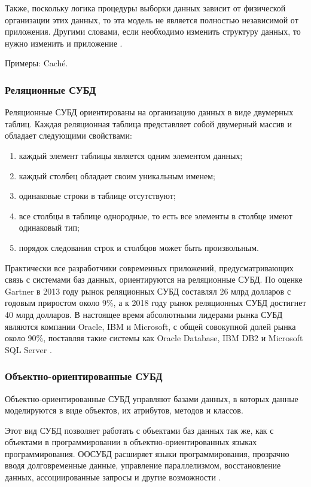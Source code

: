 \documentclass[a4paper,14pt]{extreport}
\begin{document}
Также, поскольку логика процедуры выборки данных зависит от физической организации этих данных, то эта модель не является полностью независимой от приложения. Другими словами, если необходимо изменить структуру данных, то нужно изменить и приложение \cite{scienceforum}.

Примеры: Caché.

\subsubsection*{Реляционные СУБД}
Реляционные СУБД ориентированы на организацию данных в виде двумерных таблиц. Каждая реляционная таблица представляет собой двумерный массив и обладает следующими свойствами:

\begin{enumerate}
	\setlength\itemsep{0.01em}
	\item каждый элемент таблицы является одним элементом данных;
	\item каждый столбец обладает своим уникальным именем;
	\item одинаковые строки в таблице отсутствуют;
	\item все столбцы в таблице однородные, то есть все элементы в столбце имеют одинаковый тип;
	\item порядок следования строк и столбцов может быть произвольным.
\end{enumerate}

Практически все разработчики современных приложений, предусматривающих связь с системами баз данных, ориентируются на реляционные СУБД. По оценке Gartner в 2013 году рынок реляционных СУБД составлял 26 млрд долларов с годовым приростом около 9\%, а к 2018 году рынок реляционных СУБД достигнет 40 млрд долларов. В настоящее время абсолютными лидерами рынка СУБД являются компании Oracle, IBM и Microsoft, с общей совокупной долей рынка около 90\%, поставляя такие системы как Oracle Database, IBM DB2 и Microsoft SQL Server \cite{dbms}.

\subsubsection*{Объектно-ориентированные СУБД}
Объектно-ориентированные СУБД управляют базами данных, в которых данные моделируются в виде объектов, их атрибутов, методов и классов.

Этот вид СУБД позволяет работать с объектами баз данных так же, как с объектами в программировании в объектно-ориентированных языках программирования. ООСУБД расширяет языки программирования, прозрачно вводя долговременные данные, управление параллелизмом, восстановление данных, ассоциированные запросы и другие возможности  \cite{dbms}.
\end{document}
